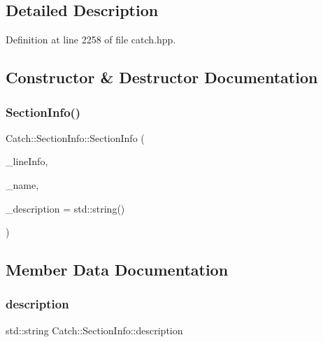 \subsection{Detailed Description}


Definition at line 2258 of file catch.\+hpp.



\subsection{Constructor \& Destructor Documentation}
\hypertarget{struct_catch_1_1_section_info_a27aff3aaf8b6611f3651b17111a272c6}{}\label{struct_catch_1_1_section_info_a27aff3aaf8b6611f3651b17111a272c6} 
\subsubsection{\texorpdfstring{Section\+Info()}{SectionInfo()}}
{\footnotesize\ttfamily Catch\+::\+Section\+Info\+::\+Section\+Info (\begin{DoxyParamCaption}\item[{\hyperlink{struct_catch_1_1_source_line_info}{Source\+Line\+Info} const \&}]{\+\_\+line\+Info,  }\item[{std\+::string const \&}]{\+\_\+name,  }\item[{std\+::string const \&}]{\+\_\+description = {\ttfamily std\+:\+:string()} }\end{DoxyParamCaption})}



\subsection{Member Data Documentation}
\hypertarget{struct_catch_1_1_section_info_a0052060219a6de74bb7ade34d4163a4e}{}\label{struct_catch_1_1_section_info_a0052060219a6de74bb7ade34d4163a4e} 
\subsubsection{\texorpdfstring{description}{description}}
{\footnotesize\ttfamily std\+::string Catch\+::\+Section\+Info\+::description}



